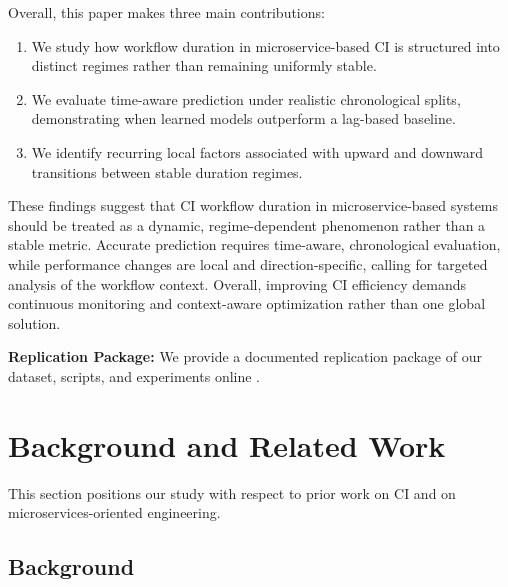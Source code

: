 \documentclass[conference]{IEEEconf}
\newcommand{\salah}[1]{\textcolor{orange}{{\it [Salah: #1]}}}
\newcommand{\jasem}[1]{\textcolor{blue}{{\it [Jasem: #1]}}}
\begin{document}
Overall, this paper makes three main contributions:

\begin{enumerate}
    \item We study how workflow duration in microservice-based CI is structured into distinct regimes rather than remaining uniformly stable. 
    \item We evaluate time-aware prediction under realistic chronological splits, demonstrating when learned models outperform a lag-based baseline. 
    \item We identify recurring local factors associated with upward and downward transitions between stable duration regimes.
\end{enumerate}

These findings suggest that CI workflow duration in microservice-based systems should be treated as a dynamic, regime-dependent phenomenon rather than a stable metric. Accurate prediction requires time-aware, chronological evaluation, while performance changes are local and direction-specific, calling for targeted analysis of the workflow context. Overall, improving CI efficiency demands continuous monitoring and context-aware optimization rather than one global solution.

\textbf{Replication Package:} We provide a documented replication package of our dataset, scripts, and experiments online \cite{qrs2026ReplicationPackage}.

\section{Background and Related Work}
This section positions our study with respect to prior work on CI and on microservices-oriented engineering.

\subsection{Background}
\end{document}
